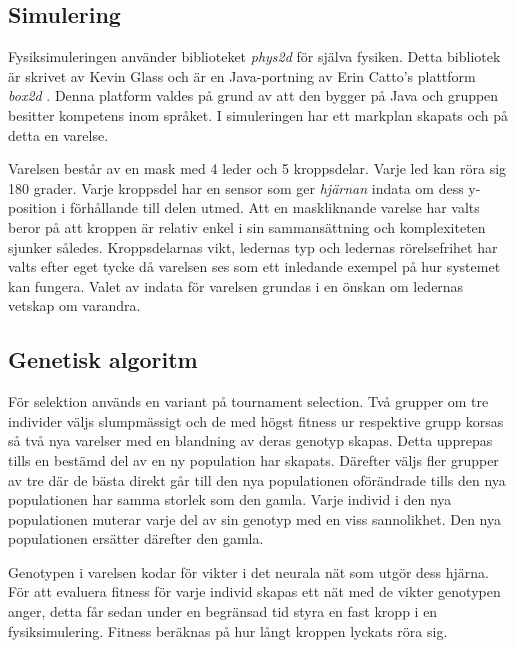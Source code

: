 \documentclass[titlepage, twocolumn, a4paper, 12pt]{article}
\begin{document}
\subsection{Simulering}
Fysiksimuleringen använder biblioteket \textit{phys2d} \cite{phys2d} för själva fysiken. Detta bibliotek är skrivet av Kevin Glass och är en Java-portning av Erin Catto's plattform \textit{box2d} \cite{box2d}. Denna platform valdes på grund av att den bygger på Java och gruppen besitter kompetens inom språket. I simuleringen har ett markplan skapats och på detta en varelse. 

Varelsen består av en mask med 4 leder och 5 kroppsdelar. Varje led kan röra sig 180 grader. Varje kroppsdel har en sensor som ger \textit{hjärnan} indata om dess y-position i förhållande till delen utmed. Att en maskliknande varelse har valts beror på att kroppen är relativ enkel i sin sammansättning och komplexiteten sjunker således. Kroppsdelarnas vikt, ledernas typ och ledernas rörelsefrihet har valts efter eget tycke då varelsen ses som ett inledande exempel på hur systemet kan fungera. Valet av indata för varelsen grundas i en önskan om ledernas vetskap om varandra.


\subsection{Genetisk algoritm}
För selektion används en variant på tournament selection. Två grupper om tre individer väljs slumpmässigt och de med högst fitness ur respektive grupp korsas så två nya varelser med en blandning av deras genotyp skapas. Detta upprepas tills en bestämd del av en ny population har skapats. Därefter väljs fler grupper av tre där de bästa direkt går till den nya populationen oförändrade tills den nya populationen har samma storlek som den gamla. Varje individ i den nya populationen muterar varje del av sin genotyp med en viss sannolikhet. Den nya populationen ersätter därefter den gamla. 
		
Genotypen i varelsen kodar för vikter i det neurala nät som utgör dess hjärna. För att evaluera fitness för varje individ skapas ett nät med de vikter genotypen anger, detta får sedan under en begränsad tid styra en fast kropp i en fysiksimulering. Fitness beräknas på hur långt kroppen lyckats röra sig.
\end{document}
